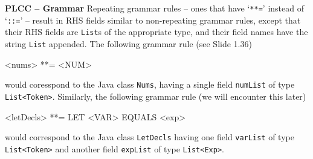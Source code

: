 \begin{minipage}[t]{\sw}
\slidenumber
\LARGE
{\bf PLCC -- Grammar}\exx
Repeating grammar rules --
ones that have `\verb'**='' instead of `\verb'::='' --
result in RHS fields similar
to non-repeating grammar rules,
except that their RHS fields are \verb'List's of the appropriate type,
and their field names have the string \verb'List' appended.\exx
The following grammar rule (see Slide 1.36)
{\Large
\begin{qv}
<nums> **= <NUM>
\end{qv}
}
would coresspond to the Java class \verb'Nums',
having a single field \verb'numList' of type \verb'List<Token>'.\exx
Similarly, the following grammar rule (we will encounter this later)
{\Large
\begin{qv}
<letDecls> **= LET <VAR> EQUALS <exp>
\end{qv}
}
would correspond to the Java class \verb'LetDecls'
having one field \verb'varList' of type \verb'List<Token>'
and another field \verb'expList' of type \verb'List<Exp>'.
\end{minipage}
\clearpage
